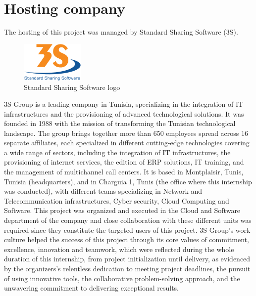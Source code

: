 \section{Hosting company}
The hosting of this project was managed by Standard Sharing Software (3S).
\smallskip\newline
\begin{figure}[htbp]
    \centering
    \includegraphics[width=0.4\linewidth]{./figures/logo_3S.png}
    \caption{Standard Sharing Software logo}
\end{figure}\newline
3S Group is a leading company in Tunisia, specializing in the integration of IT infrastructures and the provisioning of advanced technological solutions. It was founded in 1988 with the mission of transforming the Tunisian technological landscape. The group brings together more than 650 employees spread across 16 separate affiliates, each specialized in different cutting-edge technologies covering a wide range of sectors, including the integration of IT infrastructures, the provisioning of internet services, the edition of ERP solutions, IT training, and the management of multichannel call centers.\newline
It is based in Montplaisir, Tunis, Tunisia (headquarters), and in Charguia 1, Tunis (the office where this internship was conducted), with different teams specializing in Network and Telecommunication infrastructures, Cyber security, Cloud Computing and Software. This project was organized and executed in the Cloud and Software department of the company and close collaboration with these different units was required since they constitute the targeted users of this project.\newline
3S Group's work culture helped the success of this project through its core values of commitment, excellence, innovation and teamwork, which were reflected during the whole duration of this internship, from project initialization until delivery, as evidenced by the organizers's relentless dedication to meeting project deadlines, the pursuit of using innovative tools, the collaborative problem-solving approach, and the unwavering commitment to delivering exceptional results.
\newpage

